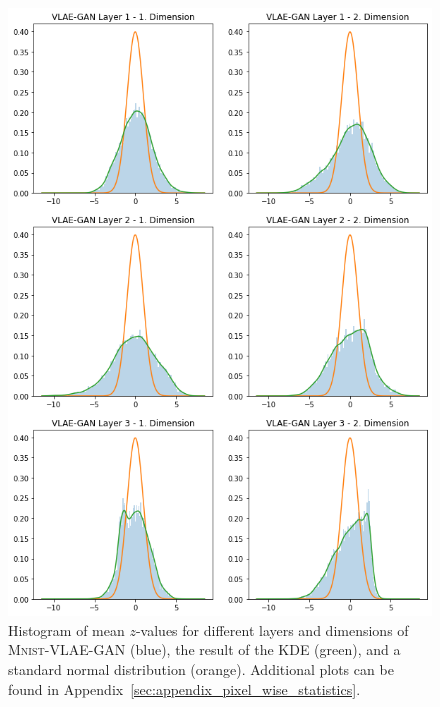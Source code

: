 \begin{figure}
    \centering
    \includegraphics[width=.8\textwidth]{images/generated_vs_true/mnist/vlae_gan_kde.png}
    \caption[\textsc{Mnist}-\ac{VLAE}-GAN - Latent Space Distribution]{Histogram of mean $z$-values for different layers and dimensions of \textsc{Mnist}-\ac{VLAE}-\ac{GAN} (blue), the result of the \ac{KDE} (green), and a standard normal distribution (orange). Additional plots can be found in Appendix~\ref{sec:appendix_pixel_wise_statistics}.}
    \label{fig:vlae_gan_kde}
\end{figure}


